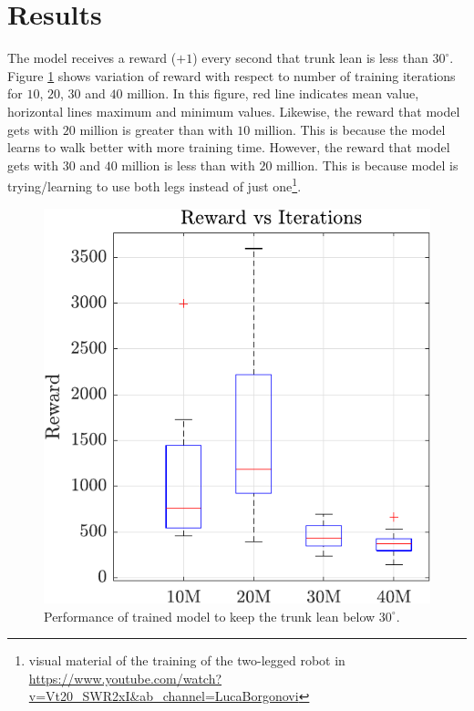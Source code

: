 \section{Results}
The model receives a reward ($+1$) every second that trunk lean is less than $30^{\circ}$. Figure \ref{fig:boxplot} shows variation of reward with respect to number of training iterations for $10$, $20$, $30$ and $40$ million. In this figure, red line indicates mean value, horizontal lines maximum and minimum values. Likewise, the reward that model gets with $20$ million is greater than with $10$ million. This is because the model learns to walk better with more training time. However, the reward that model gets with $30$ and $40$ million is less than with $20$ million. This is because model is trying/learning to use both legs instead of just one\footnote{visual material of the training of the two-legged robot in \url{https://www.youtube.com/watch?v=Vt20_SWR2xI&ab_channel=LucaBorgonovi}}.


\begin{figure}
	\centering
	\includegraphics{images/reward_vs_iter.pdf}
	\caption{Performance of trained model to keep the trunk lean below $30^{\circ}$.}
	\label{fig:boxplot}
\end{figure}

